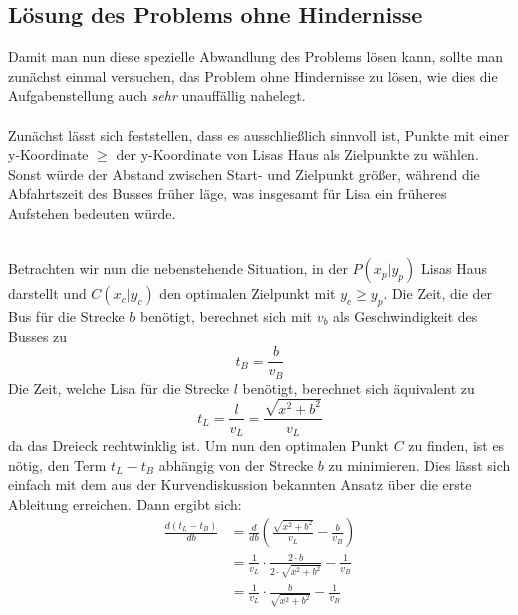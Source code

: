 \documentclass[a4paper, notitlepage, 12pt]{scrartcl}
\begin{document}
 \subsection{Lösung des Problems ohne Hindernisse}
 Damit man nun diese spezielle Abwandlung des Problems lösen kann, sollte man zunächst einmal versuchen, das Problem ohne Hindernisse zu lösen, wie dies die Aufgabenstellung auch \emph{sehr} unauffällig nahelegt. \\ \\
 Zunächst lässt sich feststellen, dass es ausschließlich sinnvoll ist, Punkte mit einer y-Koordinate $\geq$ der y-Koordinate von Lisas Haus als Zielpunkte zu wählen. Sonst würde der Abstand zwischen Start- und Zielpunkt größer, während die Abfahrtszeit des Busses früher läge, was insgesamt für Lisa ein früheres Aufstehen bedeuten würde. \\ \\
\begin{figure}
	\begin{tikzpicture}
	\end{tikzpicture}
\end{figure}
 Betrachten wir nun die nebenstehende Situation, in der $P(x_p|y_p)$ Lisas Haus darstellt und $C(x_c|y_c)$ den optimalen Zielpunkt mit $y_c \geq y_p$. Die Zeit, die der Bus für die Strecke $b$ benötigt, berechnet sich mit $v_b$ als Geschwindigkeit des Busses zu
 \begin{equation}
 t_B = \frac{b}{v_B}
 \end{equation}
 Die Zeit, welche Lisa für die Strecke $l$ benötigt, berechnet sich äquivalent zu
 \begin{equation}
 t_L = \frac{l}{v_L} = \frac{\sqrt{x^2 + b^2}}{v_L}
 \end{equation}
 da das Dreieck rechtwinklig ist. Um nun den optimalen Punkt $C$ zu finden, ist es nötig, den Term $t_L - t_B$ abhängig von der Strecke $b$ zu minimieren. Dies lässt sich einfach mit dem aus der Kurvendiskussion bekannten Ansatz über die erste Ableitung erreichen. Dann ergibt sich:
 \begin{equation}
 \begin{split}
 \frac{d (t_L - t_B)}{db} & =  \frac{d}{db} (\frac{\sqrt{x^2 + b^2}}{v_L} - \frac{b}{v_B}) \\
 & = \frac{1}{v_L} \cdot \frac{2 \cdot b}{2 \cdot \sqrt{x^2 + b^2}} - \frac{1}{v_B} \\
 & = \frac{1}{v_L} \cdot \frac{b}{\sqrt{x^2 + b^2}} - \frac{1}{v_B}
 \end{split}
 \end{equation}
\end{document}

